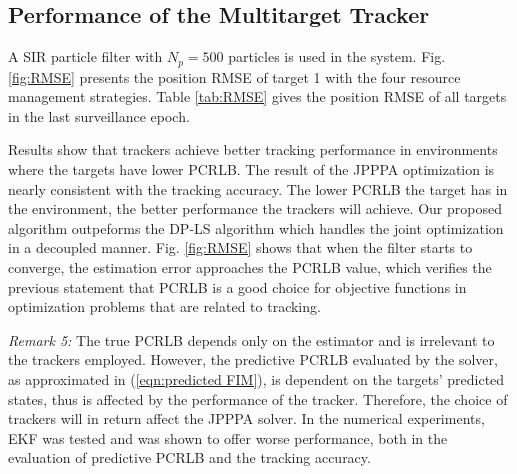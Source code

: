 \documentclass[12pt,journal,draftclsnofoot,onecolumn]{IEEEtran}
\begin{document}
\subsection{Performance of the Multitarget Tracker}
A SIR particle filter with $N_p=500$ particles is used in the system. Fig. \ref{fig:RMSE}%
 presents the position RMSE of target 1 with the four resource management strategies. Table \ref{tab:RMSE} %
 gives the position RMSE of all targets in the last surveillance epoch.

Results %
show that trackers achieve better tracking performance in environments where the targets have lower PCRLB. The result of the JPPPA optimization is nearly consistent with the tracking accuracy. The lower PCRLB the target has in the environment, the better performance the trackers will achieve. Our proposed algorithm outpeforms the DP-LS algorithm which handles the joint optimization in a decoupled manner. Fig. \ref{fig:RMSE} shows that when the filter starts to converge, the estimation error approaches the PCRLB value, which verifies the previous statement that PCRLB is a good choice for objective functions in optimization problems that are related to tracking. 


\emph{Remark 5:} The true PCRLB depends only on the estimator and is irrelevant to the trackers employed. However, the predictive PCRLB evaluated by the solver, as approximated in (\ref{eqn:predicted FIM}), is dependent on the targets' predicted states, thus is affected by the performance of the tracker. Therefore, the choice of trackers will in return affect the JPPPA solver. In the numerical experiments, EKF was tested and was shown to offer worse performance, both in the evaluation of predictive PCRLB and the tracking accuracy. %
\end{document}

